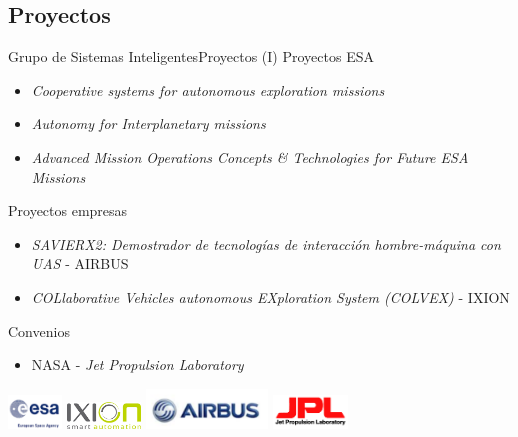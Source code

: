 \documentclass[10pt,compress]{beamer} %
\begin{document}
\subsection{Proyectos}
\begin{frame}{Grupo de Sistemas Inteligentes}{Proyectos (I)}
    Proyectos ESA
        \begin{itemize}
            \item \textit{Cooperative systems for autonomous exploration missions}
            \item \textit{Autonomy for Interplanetary missions}
            \item \textit{Advanced Mission Operations Concepts \& Technologies for Future ESA Missions}
        \end{itemize}
    Proyectos empresas
        \begin{itemize}
        \item \textit{SAVIERX2: Demostrador de tecnologías de interacción hombre-máquina con UAS} - AIRBUS
        \item \textit{COLlaborative Vehicles autonomous EXploration System (COLVEX)} - IXION
        \end{itemize}
     Convenios
        \begin{itemize}
            \item NASA - \textit{Jet Propulsion Laboratory}
        \end{itemize}
     \centering
     \smallskip 
     \includegraphics[height=25pt]{figs/esalogo}
     \quad
    \includegraphics[height=20pt]{figs/ixionlogo}
    \quad
    \includegraphics[height=30pt]{figs/airbuslogo}     
    \quad
    \includegraphics[height=25pt]{figs/jpllogo}

    \note{
    }  
\end{frame}
\end{document}
